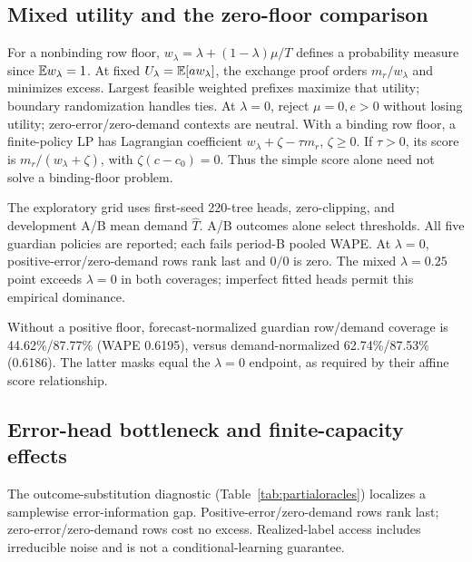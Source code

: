\subsection{Mixed utility and the zero-floor comparison}
\label{app:mixed}
For a nonbinding row floor, $w_\lambda=\lambda+(1-\lambda)\mu/T$ defines a probability measure since $\mathbb{E} w_\lambda=1$. At fixed $U_\lambda=\mathbb{E}[aw_\lambda]$, the exchange proof orders $m_r/w_\lambda$ and minimizes excess. Largest feasible weighted prefixes maximize that utility; boundary randomization handles ties. At $\lambda=0$, reject $\mu=0,e>0$ without losing utility; zero-error/zero-demand contexts are neutral. With a binding row floor, a finite-policy LP has Lagrangian coefficient $w_\lambda+\zeta-\tau m_r$, $\zeta\geq0$. If $\tau>0$, its score is $m_r/(w_\lambda+\zeta)$, with $\zeta(c-c_0)=0$. Thus the simple score alone need not solve a binding-floor problem.

The exploratory grid uses first-seed 220-tree heads, zero-clipping, and development A/B mean demand $\hat T$. A/B outcomes alone select thresholds. All five guardian policies are reported; each fails period-B pooled WAPE. At $\lambda=0$, positive-error/zero-demand rows rank last and $0/0$ is zero. The mixed $\lambda=0.25$ point exceeds $\lambda=0$ in both coverages; imperfect fitted heads permit this empirical dominance.


Without a positive floor, forecast-normalized guardian row/demand coverage is 44.62\%/87.77\% (WAPE 0.6195), versus demand-normalized 62.74\%/87.53\% (0.6186). The latter masks equal the $\lambda=0$ endpoint, as required by their affine score relationship.

\subsection{Error-head bottleneck and finite-capacity effects}

The outcome-substitution diagnostic (Table~\ref{tab:partialoracles}) localizes a samplewise error-information gap. Positive-error/zero-demand rows rank last; zero-error/zero-demand rows cost no excess. Realized-label access includes irreducible noise and is not a conditional-learning guarantee.

